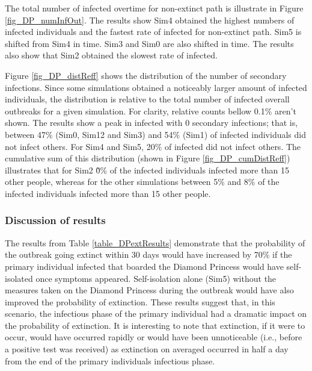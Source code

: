 \documentclass[sr]{drdc-report}
\begin{document}
The total number of infected overtime for non-extinct path is illustrate in Figure \ref{fig_DP_numInfOut}. The results show Sim4 obtained the highest numbers of infected individuals and the fastest rate of infected for non-extinct path. Sim5 is shifted from Sim4 in time. Sim3 and Sim0 are also shifted in time. The results also show that Sim2 obtained the slowest rate of infected. 

Figure \ref{fig_DP_distReff}  shows the distribution of the number of secondary infections. Since some simulations obtained a noticeably larger amount of infected individuals, the distribution is relative to the total number of infected overall outbreaks for a given simulation. For clarity, relative counts bellow 0.1\% aren't shown. The results show a peak in infected with 0 secondary infections; that is, between 47\% (Sim0, Sim12 and Sim3) and 54\% (Sim1) of infected individuals did not infect others. For Sim4 and Sim5, 20\% of infected did not infect others. The cumulative sum of this distribution (shown in Figure \ref{fig_DP_cumDistReff}) illustrates that for Sim2 \~0\% of the infected individuals infected more than 15 other people, whereas for the other simulations between 5\% and 8\% of the infected individuals infected more than 15 other people. 


\subsubsection{Discussion of results}

The results from Table \ref{table_DPextResults} demonstrate that the probability of the outbreak going extinct within 30 days would have increased by 70\% if the primary individual infected that boarded the Diamond Princess would have self-isolated once symptoms appeared. Self-isolation alone (Sim5) without the measures taken on the Diamond Princess during the outbreak would have also improved the probability of extinction. These results suggest that, in this scenario, the infectious phase of the primary individual had a dramatic impact on the probability of extinction. It is interesting to note that extinction, if it were to occur, would have occurred rapidly or would have been unnoticeable (i.e., before a positive test was received) as extinction on averaged occurred in half a day from the end of the primary individuals infectious phase.
\end{document}
